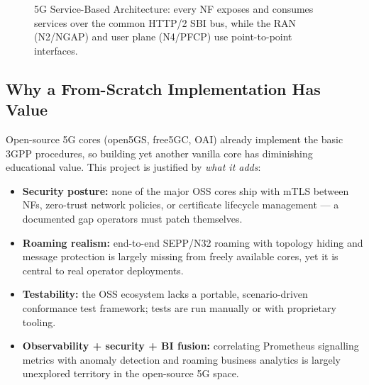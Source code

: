 \documentclass[11pt,a4paper]{report}
\begin{document}
\begin{figure}[h]
\centering
{}
\caption{5G Service-Based Architecture: every NF exposes and consumes services over the
common HTTP/2 SBI bus, while the RAN (N2/NGAP) and user plane (N4/PFCP) use point-to-point
interfaces.}
\label{fig:sba}
\end{figure}

\subsection{Why a From-Scratch Implementation Has Value}
Open-source 5G cores (open5GS, free5GC, OAI) already implement the basic 3GPP
procedures, so building yet another vanilla core has diminishing educational value.
This project is justified by \emph{what it adds}:

\begin{itemize}[leftmargin=1.4em]
  \item \textbf{Security posture:} none of the major OSS cores ship with mTLS between
        NFs, zero-trust network policies, or certificate lifecycle management --- a
        documented gap operators must patch themselves.
  \item \textbf{Roaming realism:} end-to-end SEPP/N32 roaming with topology hiding and
        message protection is largely missing from freely available cores, yet it is
        central to real operator deployments.
  \item \textbf{Testability:} the OSS ecosystem lacks a portable, scenario-driven
        conformance test framework; tests are run manually or with proprietary tooling.
  \item \textbf{Observability + security + BI fusion:} correlating Prometheus signalling
        metrics with anomaly detection and roaming business analytics is largely
        unexplored territory in the open-source 5G space.
\end{itemize}
\end{document}

